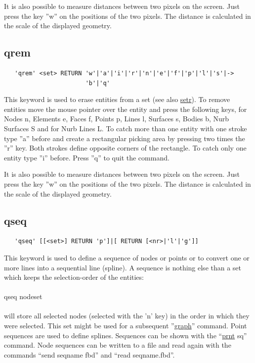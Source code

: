 \documentclass{article}
\providecommand{\htmlref}[2]{\hyperref[#2]{#1}}
\begin{document}
It is also possible to measure distances between two pixels on the screen. Just press the key ''w'' on the positions of the two pixels. The distance is calculated in the scale of the displayed geometry.  

\subsection{\label{qrem}qrem}
\begin{verbatim}
   'qrem' <set> RETURN 'w'|'a'|'i'|'r'|'n'|'e'|'f'|'p'|'l'|'s'|->
                       'b'|'q' 
\end{verbatim}
This keyword is used to erase entities from a set (see also \htmlref{setr}{setr}). To remove entities move the mouse pointer over the entity and press the following keys, for Nodes n, Elements e, Faces f, Points p, Lines l, Surfaces s, Bodies b, Nurb Surfaces S and for Nurb Lines L. To catch more than one entity with one stroke type ''a'' before and create a rectangular picking area by pressing two times the ''r'' key. Both strokes define opposite corners of the rectangle. To catch only one entity type ''i'' before. Press ''q'' to quit the command. 

It is also possible to measure distances between two pixels on the screen. Just press the key ''w'' on the positions of the two pixels. The distance is calculated in the scale of the displayed geometry.

\subsection{\label{qseq}qseq}
\begin{verbatim}
   'qseq' [[<set>] RETURN 'p']|[ RETURN [<nr>|'l'|'g']] 
\end{verbatim}
This keyword is used to define a sequence of nodes or points or to convert one or more lines into a sequential line (spline). A sequence is nothing else than a set which keeps the selection-order of the entities:\\\\qseq nodeset\\\\will store all selected nodes (selected with the 'n' key) in the order in which they were selected. This set might be used for a subsequent ''\htmlref{graph}{graph}'' command. Point sequences are used to define splines. Sequences can be shown with the ``\htmlref{prnt}{prnt} sq'' command. Node sequences can be written to a file and read again with the commands ``send seqname fbd'' and ``read seqname.fbd''.
\end{document}
